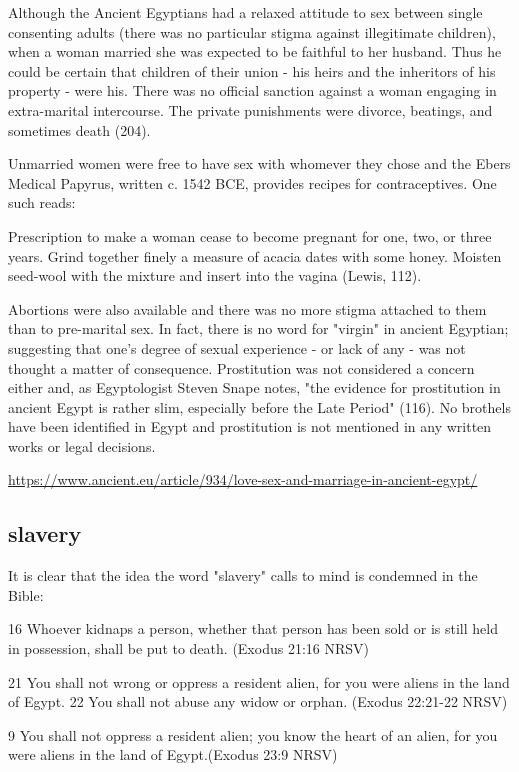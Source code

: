 \documentclass[11pt]{article}
\begin{document}
{Although the Ancient Egyptians had a relaxed attitude to sex between single consenting adults (there was no particular stigma against illegitimate children), when a woman married she was expected to be faithful to her husband. Thus he could be certain that children of their union - his heirs and the inheritors of his property - were his. There was no official sanction against a woman engaging in extra-marital intercourse. The private punishments were divorce, beatings, and sometimes death (204).


Unmarried women were free to have sex with whomever they chose and the Ebers Medical Papyrus, written c. 1542 BCE, provides recipes for contraceptives. One such reads:

Prescription to make a woman cease to become pregnant for one, two, or three years. Grind together finely a measure of acacia dates with some honey. Moisten seed-wool with the mixture and insert into the vagina (Lewis, 112).

Abortions were also available and there was no more stigma attached to them than to pre-marital sex. In fact, there is no word for "virgin" in ancient Egyptian; suggesting that one's degree of sexual experience - or lack of any - was not thought a matter of consequence. Prostitution was not considered a concern either and, as Egyptologist Steven Snape notes, "the evidence for prostitution in ancient Egypt is rather slim, especially before the Late Period" (116). No brothels have been identified in Egypt and prostitution is not mentioned in any written works or legal decisions. 


\url{https://www.ancient.eu/article/934/love-sex-and-marriage-in-ancient-egypt/}



\subsection{slavery}
It is clear that the idea the word "slavery" calls to mind is condemned in the Bible:

16 Whoever kidnaps a person, whether that person has been sold or is still held in possession, shall be put to death. (Exodus 21:16 NRSV)

21 You shall not wrong or oppress a resident alien, for you were aliens in the land of Egypt. 22 You shall not abuse any widow or orphan. (Exodus 22:21-22 NRSV)


9 You shall not oppress a resident alien; you know the heart of an alien, for you were aliens in the land of Egypt.(Exodus 23:9 NRSV)


}
\end{document}
